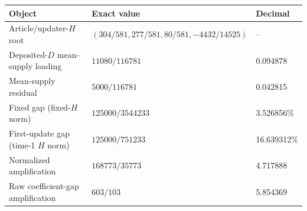 \begin{tabular}{@{}p{}p{}p{}@{}}
\toprule
Object & Exact value & Decimal \\
\midrule
Article/updater-$H$ root & $(304/581,277/581,80/581,-4432/14525)$ & -- \\
Deposited-$D$ mean-supply loading & $11080/116781$ & 0.094878 \\
Mean-supply residual & $5000/116781$ & 0.042815 \\
Fixed gap (fixed-$H$ norm) & $125000/3544233$ & 3.526856\% \\
First-update gap (time-1 $H$ norm) & $125000/751233$ & 16.639312\% \\
Normalized amplification & $168773/35773$ & 4.717888 \\
Raw coefficient-gap amplification & $603/103$ & 5.854369 \\
\bottomrule
\end{tabular}
